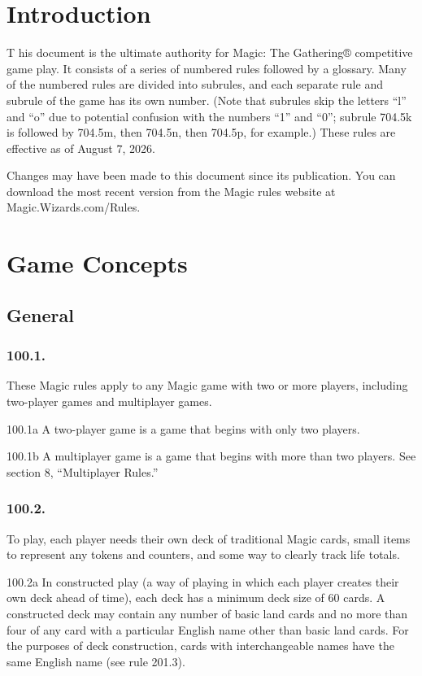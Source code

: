 	\chapter*{Introduction}
\lettrine[lines=3, depth=0]{T}{ } his document is the ultimate authority for Magic: The Gathering® competitive game play. It consists of a series of numbered rules followed by a glossary. Many of the numbered rules are divided into subrules, and each separate rule and subrule of the game has its own number. (Note that subrules skip the letters “l” and “o” due to potential confusion with the numbers “1” and “0”; subrule 704.5k is followed by 704.5m, then 704.5n, then 704.5p, for example.) These rules are effective as of August 7, 2026.

Changes may have been made to this document since its publication. You can download the most recent version from the Magic rules website at Magic.Wizards.com/Rules.

\chapter{Game Concepts}
\setcounter{section}{99}
\section{General}
\subsection*{100.1.}
These Magic rules apply to any Magic game with two or more players, including two-player games and multiplayer games.

100.1a A two-player game is a game that begins with only two players.

100.1b A multiplayer game is a game that begins with more than two players. See section 8, “Multiplayer Rules.”

\subsection*{100.2.}
To play, each player needs their own deck of traditional Magic cards, small items to represent any tokens and counters, and some way to clearly track life totals.

100.2a In constructed play (a way of playing in which each player creates their own deck ahead of time), each deck has a minimum deck size of 60 cards. A constructed deck may contain any number of basic land cards and no more than four of any card with a particular English name other than basic land cards. For the purposes of deck construction, cards with interchangeable names have the same English name (see rule 201.3).

